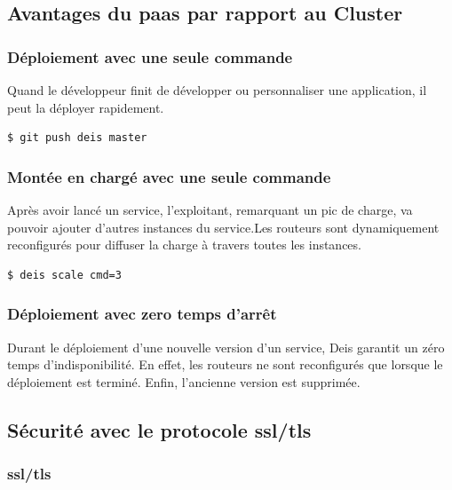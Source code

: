 \begin{onehalfspace}
\subsection{Avantages du \acrshort{paas} par rapport au Cluster}

\subsubsection*{Déploiement avec une seule commande}

	Quand le développeur finit de développer ou personnaliser une application, il peut la déployer rapidement.

	\begin{lstlisting}[language=bash,caption=Déploiement avec Deis]
		$ git push deis master
	\end{lstlisting}

\subsubsection*{Montée en chargé avec une seule commande}

Après avoir lancé un service, l'exploitant, remarquant un pic de charge, va pouvoir ajouter d'autres instances du service.Les routeurs sont dynamiquement reconfigurés pour diffuser la charge à travers toutes les instances.

	\begin{lstlisting}[language=bash,caption=Montée en charge]
		$ deis scale cmd=3
	\end{lstlisting}

\subsubsection*{Déploiement avec zero temps d'arrêt}

Durant le déploiement d'une nouvelle version d'un service, Deis garantit un zéro temps d'indisponibilité. En effet, les routeurs ne sont reconfigurés que lorsque le déploiement est terminé. Enfin, l'ancienne version est supprimée.







\subsection{Sécurité avec le protocole \acrshort{ssl}/\acrshort{tls}}

\subsubsection{\acrshort{ssl}/\acrshort{tls}}


\end{onehalfspace}
